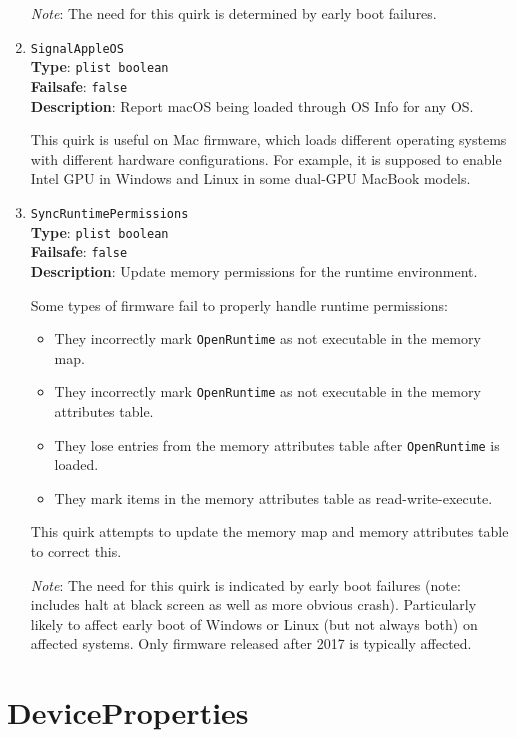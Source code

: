 \documentclass[]{article}
\providecommand{\tightlist}{%
  \setlength{\itemsep}{0pt}\setlength{\parskip}{0pt}}
\begin{document}
\begin{enumerate}
  \emph{Note}: The need for this quirk is determined by early boot failures.

\item
  \texttt{SignalAppleOS}\\
  \textbf{Type}: \texttt{plist\ boolean}\\
  \textbf{Failsafe}: \texttt{false}\\
  \textbf{Description}: Report macOS being loaded through OS Info for any OS.

  This quirk is useful on Mac firmware, which loads different operating systems
  with different hardware configurations. For example, it is supposed to enable
  Intel GPU in Windows and Linux in some dual-GPU MacBook models.

\item
  \texttt{SyncRuntimePermissions}\\
  \textbf{Type}: \texttt{plist\ boolean}\\
  \textbf{Failsafe}: \texttt{false}\\
  \textbf{Description}: Update memory permissions for the runtime environment.

  Some types of firmware fail to properly handle runtime permissions:
  \begin{itemize}
    \tightlist
    \item They incorrectly mark \texttt{OpenRuntime} as not executable in the memory map.
    \item They incorrectly mark \texttt{OpenRuntime} as not executable in the memory
    attributes table.
    \item They lose entries from the memory attributes table after \texttt{OpenRuntime}
    is loaded.
    \item They mark items in the memory attributes table as read-write-execute.
  \end{itemize}

  This quirk attempts to update the memory map and memory attributes table to correct this.

  \emph{Note}: The need for this quirk is indicated by early boot failures (note: includes halt at black
  screen as well as more obvious crash). Particularly likely to affect early boot of Windows or Linux (but
  not always both) on affected systems. Only firmware released after 2017 is typically affected.

\end{enumerate}

\section{DeviceProperties}\label{devprops}
\end{document}
